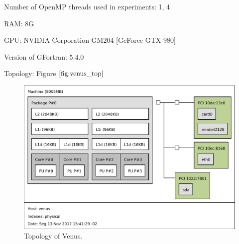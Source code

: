 \begin{itemize}
		Number of OpenMP threads used in experiments: 1, 4

		RAM: 8G

		GPU: NVIDIA Corporation GM204 [GeForce GTX 980]

		Version of GFortran: 5.4.0

		Topology: Figure $\ref{fig:venus_top}$

		\begin{figure}[htb]
		\centering \includegraphics[scale=1.0,angle=90]{figuras/venus}
		\caption{\label{fig:venus_top}Topology of Venus.}
		\end{figure}

\end{itemize}
